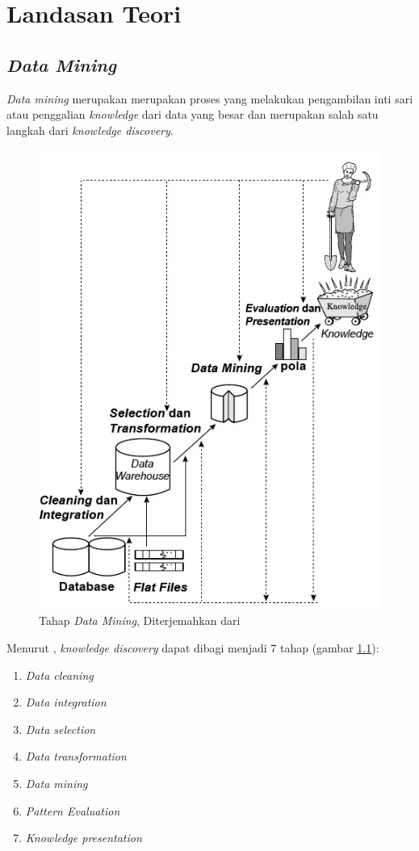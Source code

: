 \chapter{Landasan Teori}
\label{chap:definition}

\section{\textsl{Data Mining}}

\textsl{Data mining} merupakan merupakan proses yang melakukan pengambilan inti sari atau penggalian \textsl{knowledge} dari data yang besar dan merupakan salah satu langkah dari \textsl{knowledge discovery}.


\begin{figure}[H]
\centering
\includegraphics[scale=0.9]{Gambar/tahapdatamining.jpg}
\caption[Tahap \textsl{Data Mining}]{Tahap \textsl{Data Mining}, Diterjemahkan dari \cite{DM}} 
\label{fig:tahapDataMining}
\end{figure}

Menurut \cite{DM}, \textsl{knowledge discovery} dapat dibagi menjadi 7 tahap (gambar \ref{fig:tahapDataMining}):
\begin{enumerate}
	\item \textsl{Data cleaning}
	\item \textsl{Data integration}
	\item \textsl{Data selection}
	\item \textsl{Data transformation}
	\item \textsl {Data mining}
	\item \textsl{Pattern Evaluation}
	\item \textsl{Knowledge presentation}
\end{enumerate}


